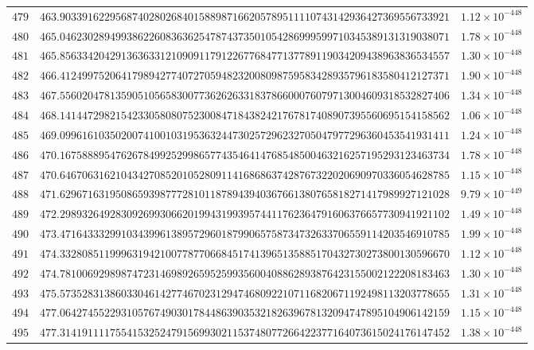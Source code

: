 \documentclass[12pt,reqno]{amsart}
\theoremstyle{remark}
\begin{document}
\begin{longtable}{clc}
$479$ & $463.9033916229568740280268401588987166205789511110743142936427369556733921$ & $1.12\times 10^{-448}$ \\
$480$ & $465.0462302894993862260836362547874373501054286999599710345389131319038071$ & $1.78\times 10^{-448}$ \\
$481$ & $465.8563342042913636331210909117912267768477137789119034209438963836534557$ & $1.30\times 10^{-448}$ \\
$482$ & $466.4124997520641798942774072705948232008098759583428935796183580412127371$ & $1.90\times 10^{-448}$ \\
$483$ & $467.5560204781359051056583007736262633183786600076079713004609318532827406$ & $1.34\times 10^{-448}$ \\
$484$ & $468.1414472982154233058080752300847184382421767817408907395560695154158562$ & $1.06\times 10^{-448}$ \\
$485$ & $469.0996161035020074100103195363244730257296232705047977296360453541931411$ & $1.24\times 10^{-448}$ \\
$486$ & $470.1675888954762678499252998657743546414768548500463216257195293123463734$ & $1.78\times 10^{-448}$ \\
$487$ & $470.6467063162104342708520105280911416868637428767322020690970336054628785$ & $1.15\times 10^{-448}$ \\
$488$ & $471.6296716319508659398777281011878943940367661380765818271417989927121028$ & $9.79\times 10^{-449}$ \\
$489$ & $472.2989326492830926993066201994319939574411762364791606376657730941921102$ & $1.49\times 10^{-448}$ \\
$490$ & $473.4716433329910343996138957296018799065758734732633706559114203546910785$ & $1.99\times 10^{-448}$ \\
$491$ & $474.3328085119996319421007787706684517413965135885170432730273800130596670$ & $1.12\times 10^{-448}$ \\
$492$ & $474.7810069298987472314698926595259935600408862893876423155002122208183463$ & $1.30\times 10^{-448}$ \\
$493$ & $475.5735283138603304614277467023129474680922107116820671192498113203778655$ & $1.31\times 10^{-448}$ \\
$494$ & $477.0642745522931057674903017844863903532182639678132094747895104906142159$ & $1.15\times 10^{-448}$ \\
$495$ & $477.3141911117554153252479156993021153748077266422377164073615024176147452$ & $1.38\times 10^{-448}$ \\

\end{longtable}
\end{document}
